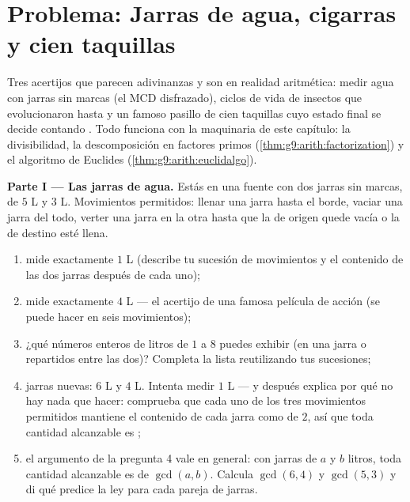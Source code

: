 \section{Problema: Jarras de agua, cigarras y cien taquillas}

\begin{problem}
\label{pb:g9:arith:1}
Tres acertijos que parecen adivinanzas y son en realidad aritmética:
medir agua con jarras sin marcas (el MCD disfrazado), ciclos
de vida de insectos que evolucionaron hasta  y un famoso
pasillo de cien taquillas cuyo estado final se decide
contando . Todo funciona con la maquinaria de este capítulo:
la divisibilidad, la descomposición en factores primos
(\cref{thm:g9:arith:factorization}) y el algoritmo de Euclides
(\cref{thm:g9:arith:euclidalgo}).

\medskip
\noindent\textbf{Parte I --- Las jarras de agua.}
Estás en una fuente con dos jarras sin marcas, de $5$ L y
$3$ L. Movimientos permitidos: llenar una jarra hasta el borde, vaciar una jarra
del todo, verter una jarra en la otra hasta que la de origen quede
vacía o la de destino esté llena.
\begin{enumerate}
  \item mide exactamente $1$ L (describe tu sucesión de movimientos
        y el contenido de las dos jarras después de cada uno);
  \item mide exactamente $4$ L --- el acertijo de una famosa
        película de acción (se puede hacer en seis movimientos);
  \item ¿qué números enteros de litros de $1$ a $8$ puedes
        exhibir (en una jarra o repartidos entre las dos)? Completa la
        lista reutilizando tus sucesiones;
  \item jarras nuevas: $6$ L y $4$ L. Intenta medir $1$ L --- y después
        explica por qué no hay nada que hacer: comprueba que cada uno de los tres
        movimientos permitidos mantiene el contenido de cada jarra como  de
        $2$, así que toda cantidad alcanzable es ;
  \item el argumento de la pregunta 4 vale en general: con jarras de $a$
        y $b$ litros, toda cantidad alcanzable es  de
        $\gcd(a, b)$. Calcula $\gcd(6, 4)$ y $\gcd(5, 3)$ y
        di qué predice la ley para cada pareja de jarras.
\end{enumerate}


\end{problem}
